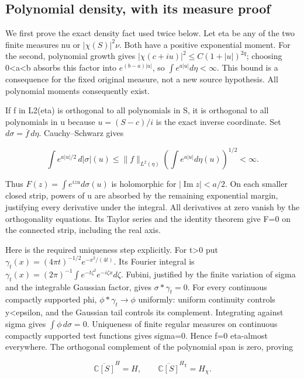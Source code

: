 \subsection{Polynomial density, with its measure proof}\label{polynomial-density-with-its-measure-proof}

We first prove the exact density fact used twice below. Let eta be any of the two finite measures nu or \(|\chi(S)|^2\nu\). Both have a positive exponential moment. For the second, polynomial growth gives \(|\chi(c+iu)|^2\le C(1+|u|)^{2q}\); choosing 0\textless a\textless b absorbs this factor into \(e^{(b-a)|u|}\), so \(\int e^{a|u|}d\eta<\infty\). This bound is a consequence for the fixed original measure, not a new source hypothesis. All polynomial moments consequently exist.

If f in L2(eta) is orthogonal to all polynomials in S, it is orthogonal to all polynomials in u because \(u=(S-c)/i\) is the exact inverse coordinate. Set \(d\sigma=\overline f\,d\eta\). Cauchy--Schwarz gives

\[
\int e^{a|u|/2}\,d|\sigma|(u)
\le \|f\|_{L^2(\eta)}\left(\int e^{a|u|}d\eta(u)\right)^{1/2}<\infty.
\tag{CR4}
\]

Thus \(F(z)=\int e^{izu}d\sigma(u)\) is holomorphic for \(|\operatorname{Im}z|<a/2\). On each smaller closed strip, powers of \textbar u\textbar{} are absorbed by the remaining exponential margin, justifying every derivative under the integral. All derivatives at zero vanish by the orthogonality equations. Its Taylor series and the identity theorem give F=0 on the connected strip, including the real axis.

Here is the required uniqueness step explicitly. For t\textgreater0 put \(\gamma_t(x)=(4\pi t)^{-1/2}e^{-x^2/(4t)}\). Its Fourier integral is \(\gamma_t(x)=(2\pi)^{-1}\int e^{-t\zeta^2}e^{-i\zeta x}d\zeta\). Fubini, justified by the finite variation of sigma and the integrable Gaussian factor, gives \(\sigma*\gamma_t=0\). For every continuous compactly supported phi, \(\phi*\gamma_t\to\phi\) uniformly: uniform continuity controls \textbar y\textbar\textless epsilon, and the Gaussian tail controls its complement. Integrating against sigma gives \(\int\phi\,d\sigma=0\). Uniqueness of finite regular measures on continuous compactly supported test functions gives sigma=0. Hence f=0 eta-almost everywhere. The orthogonal complement of the polynomial span is zero, proving

\[
\overline{\mathbb C[S]}^{H}=H,\qquad
\overline{\mathbb C[S]}^{H_\chi}=H_\chi.
\tag{CR5}
\]


